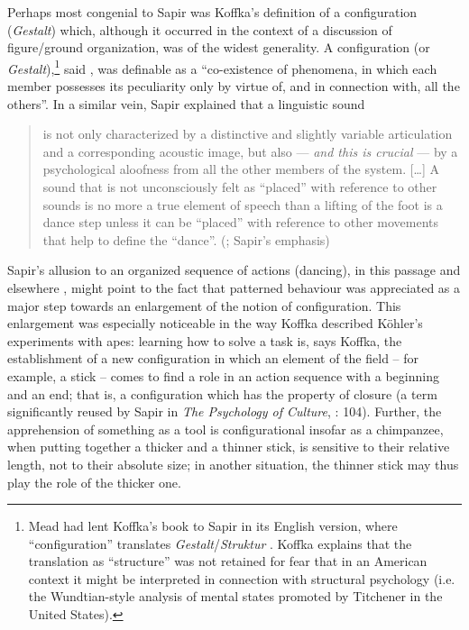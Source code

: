 \documentclass[output=paper]{langscibook}
\begin{document}
Perhaps most congenial to Sapir was Koffka's definition of a configuration (\emph{Ge\-stalt}) which, although it occurred in the context of a discussion of figure/ground organization, was of the widest generality. A configuration (or \emph{Gestalt}),\footnote{Mead had lent Koffka's book to Sapir in its English version, where ``configuration'' translates \emph{Gestalt}/\emph{Struktur} \citep[185]{Darnell1990}. Koffka explains that the translation as ``structure'' was not retained for fear that in an American context it might be interpreted in connection with structural psychology (i.e. the Wundtian-style analysis of mental states promoted by Titchener in the United States).} said \citet[146]{Koffka1924}, was definable as a ``co-existence of phenomena, in which each member possesses its peculiarity only by virtue of, and in connection with, all the others''. In a similar vein, Sapir explained that a linguistic sound 

\largerpage 
\begin{quotation}
is not only characterized by a distinctive and slightly variable articulation and a corresponding acoustic image, but also — \emph{and this is crucial} — by a psychological aloofness from all the other members of the system. […] A sound that is not unconsciously felt as ``placed'' with reference to other sounds is no more a true element of speech than a lifting of the foot is a dance step unless it can be ``placed'' with reference to other movements that help to define the ``dance''. (\citealt[35]{Sapir1925}; Sapir's emphasis)
\end{quotation}

Sapir's allusion to an organized sequence of actions (dancing), in this passage and elsewhere \citep[104--105]{Sapir2002}, might point to the fact that patterned behaviour was appreciated as a major step towards an enlargement of the notion of configuration. This enlargement was especially noticeable in the way Koffka described Köhler's experiments with apes: learning how to solve a task is, says Koffka, the establishment of a new configuration in which an element of the field -- for example, a stick -- comes to find a role in an action sequence with a beginning and an end; that is, a configuration which has the property of closure (a term significantly reused by Sapir in \emph{The Psychology of Culture}, \citeyear{Sapir2002}: 104). Further, the apprehension of something as a tool is configurational insofar as a chimpanzee, when putting together a thicker and a thinner stick, is sensitive to their relative length, not to their absolute size; in another situation, the thinner stick may thus play the role of the thicker one.
\end{document}
